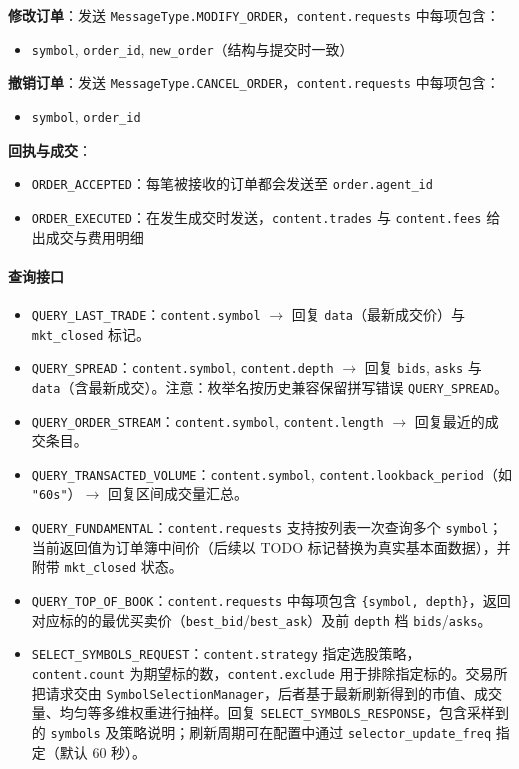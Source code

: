 \noindent\textbf{修改订单}：发送 \verb|MessageType.MODIFY_ORDER|，\verb|content.requests| 中每项包含：
\begin{itemize}
  \item \texttt{symbol}, \texttt{order\_id}, \texttt{new\_order}（结构与提交时一致）
\end{itemize}

\noindent\textbf{撤销订单}：发送 \verb|MessageType.CANCEL_ORDER|，\verb|content.requests| 中每项包含：
\begin{itemize}
  \item \texttt{symbol}, \texttt{order\_id}
\end{itemize}

\noindent\textbf{回执与成交}：
\begin{itemize}
  \item \verb|ORDER_ACCEPTED|：每笔被接收的订单都会发送至 \verb|order.agent_id|
  \item \verb|ORDER_EXECUTED|：在发生成交时发送，\verb|content.trades| 与 \verb|content.fees| 给出成交与费用明细
\end{itemize}

\paragraph{查询接口}
\begin{itemize}
  \item \verb|QUERY_LAST_TRADE|：\verb|content.symbol| $\rightarrow$ 回复 \verb|data|（最新成交价）与 \verb|mkt_closed| 标记。
  \item \verb|QUERY_SPREAD|：\verb|content.symbol|, \verb|content.depth| $\rightarrow$ 回复 \verb|bids|, \verb|asks| 与 \verb|data|（含最新成交）。注意：枚举名按历史兼容保留拼写错误 \verb|QUERY_SPREAD|。
  \item \verb|QUERY_ORDER_STREAM|：\verb|content.symbol|, \verb|content.length| $\rightarrow$ 回复最近的成交条目。
  \item \verb|QUERY_TRANSACTED_VOLUME|：\verb|content.symbol|, \verb|content.lookback_period|（如 \verb|"60s"|）$\rightarrow$ 回复区间成交量汇总。
  \item \verb|QUERY_FUNDAMENTAL|：\verb|content.requests| 支持按列表一次查询多个 \verb|symbol|；当前返回值为订单簿中间价（后续以 TODO 标记替换为真实基本面数据），并附带 \verb|mkt_closed| 状态。
  \item \verb|QUERY_TOP_OF_BOOK|：\verb|content.requests| 中每项包含 \verb|{symbol, depth}|，返回对应标的的最优买卖价（\verb|best_bid|/\verb|best_ask|）及前 \verb|depth| 档 \verb|bids|/\verb|asks|。
  \item \verb|SELECT_SYMBOLS_REQUEST|：\verb|content.strategy| 指定选股策略，\verb|content.count| 为期望标的数，\verb|content.exclude| 用于排除指定标的。交易所把请求交由 \verb|SymbolSelectionManager|，后者基于最新刷新得到的市值、成交量、均匀等多维权重进行抽样。回复 \verb|SELECT_SYMBOLS_RESPONSE|，包含采样到的 \verb|symbols| 及策略说明；刷新周期可在配置中通过 \verb|selector_update_freq| 指定（默认 60 秒）。
\end{itemize}


